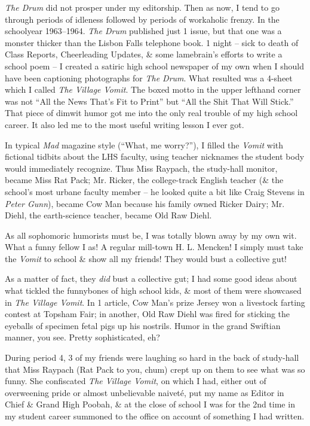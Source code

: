 \documentclass{article}
\numberwithin{equation}{section}
\begin{document}
\textit{The Drum} did not prosper under my editorship. Then as now, I tend to go through periods of idleness followed by periods of workaholic frenzy. In the schoolyear 1963--1964. \textit{The Drum} published just 1 issue, but that one was a monster thicker than the Lisbon Falls telephone book. 1 night -- sick to death of Class Reports, Cheerleading Updates, \& some lamebrain's efforts to write a school poem -- I created a satiric high school newspaper of my own when I should have been captioning photographs for \textit{The Drum}. What resulted was a 4-sheet which I called \textit{The Village Vomit}. The boxed motto in the upper lefthand corner was not ``All the News That's Fit to Print'' but ``All the Shit That Will Stick.'' That piece of dimwit humor got me into the only real trouble of my high school career. It also led me to the most useful writing lesson I ever got.

In typical \textit{Mad} magazine style (``What, me worry?''), I filled the \textit{Vomit} with fictional tidbits about the LHS faculty, using teacher nicknames the student body would immediately recognize. Thus Miss Raypach, the study-hall monitor, became Miss Rat Pack; Mr. Ricker, the college-track English teacher (\& the school's most urbane faculty member -- he looked quite a bit like Craig Stevens in \textit{Peter Gunn}), became Cow Man because his family owned Ricker Dairy; Mr. Diehl, the earth-science teacher, became Old Raw Diehl.

As all sophomoric humorists must be, I was totally blown away by my own wit. What a funny fellow I as! A regular mill-town H. L. Mencken! I simply must take the \textit{Vomit} to school \& show all my friends! They would bust a collective gut!

As a matter of fact, they \textit{did} bust a collective gut; I had some good ideas about what tickled the funnybones of high school kids, \& most of them were showcased in \textit{The Village Vomit}. In 1 article, Cow Man's prize Jersey won a livestock farting contest at Topsham Fair; in another, Old Raw Diehl was fired for sticking the eyeballs of specimen fetal pigs up his nostrils. Humor in the grand Swiftian manner, you see. Pretty sophisticated, eh?

During period 4, 3 of my friends were laughing so hard in the back of study-hall that Miss Raypach (Rat Pack to you, chum) crept up on them to see what was so funny. She confiscated \textit{The Village Vomit}, on which I had, either out of overweening pride or almost unbelievable naivet\'e, put my name as Editor in Chief \& Grand High Poobah, \& at the close of school I was for the 2nd time in my student career summoned to the office on account of something I had written.
\end{document}
